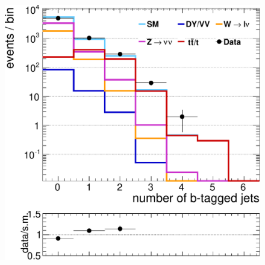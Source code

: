 \documentclass[compress, serif]{beamer}
\begin{document}
{\begin{figure}[h!]
{    \includegraphics[width=0.4\paperwidth]{../figures/data-mc/v22/had/hadronicLook_375_pfJet_ge2j_xcak5JetPFIndicesBtagged2Pat.pdf}
  } \\
\end{figure}
}
\end{document}
